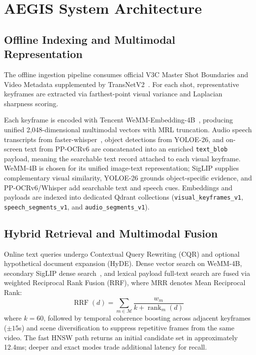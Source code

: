 \documentclass[runningheads,a4paper]{llncs}
\newcommand{\code}[1]{\texttt{#1}}
\begin{document}
\section{AEGIS System Architecture}
\label{sec:architecture}

\subsection{Offline Indexing and Multimodal Representation}
The offline ingestion pipeline consumes official V3C Master Shot Boundaries and Video Metadata supplemented by TransNetV2~\cite{soucek2020transnetv2}. For each shot, representative keyframes are extracted via farthest-point visual variance and Laplacian sharpness scoring.

Each keyframe is encoded with Tencent WeMM-Embedding-4B~\cite{wemm2025}, producing unified 2,048-dimensional multimodal vectors with MRL truncation. Audio speech transcripts from faster-whisper~\cite{radford2022whisper}, object detections from YOLOE-26, and on-screen text from PP-OCRv6 are concatenated into an enriched \code{text\_blob} payload, meaning the searchable text record attached to each visual keyframe. WeMM-4B is chosen for its unified image-text representation; SigLIP supplies complementary visual similarity, YOLOE-26 grounds object-specific evidence, and PP-OCRv6/Whisper add searchable text and speech cues. Embeddings and payloads are indexed into dedicated Qdrant collections (\code{visual\_keyframes\_v1}, \code{speech\_segments\_v1}, and \code{audio\_segments\_v1}).

\subsection{Hybrid Retrieval and Multimodal Fusion}
Online text queries undergo Contextual Query Rewriting (CQR) and optional hypothetical document expansion (HyDE). Dense vector search on WeMM-4B, secondary SigLIP dense search~\cite{zhai2023sigmoid}, and lexical payload full-text search are fused via weighted Reciprocal Rank Fusion (RRF), where MRR denotes Mean Reciprocal Rank:
\begin{equation}
\operatorname{RRF}(d) = \sum_{m \in \mathcal{M}} \frac{w_m}{k + \operatorname{rank}_m(d)}
\end{equation}
where $k=60$, followed by temporal coherence boosting across adjacent keyframes ($\pm 15$s) and scene diversification to suppress repetitive frames from the same video. The fast HNSW path returns an initial candidate set in approximately 12.4ms; deeper and exact modes trade additional latency for recall.
\end{document}
